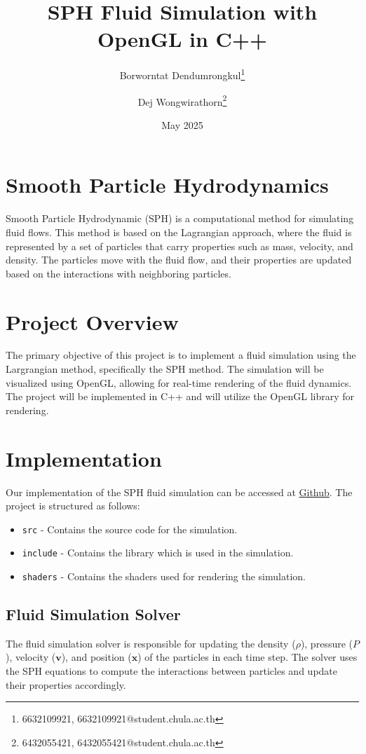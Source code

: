 \documentclass[a4paper]{article}
\title{SPH Fluid Simulation with OpenGL in C++}
\author{
  Borworntat Dendumrongkul\thanks{6632109921, 6632109921@student.chula.ac.th} \and 
  Dej Wongwirathorn\thanks{6432055421, 6432055421@student.chula.ac.th}
}
\date{May 2025}
\begin{document}
\maketitle

\section{Smooth Particle Hydrodynamics}

Smooth Particle Hydrodynamic (SPH) is a computational method for simulating fluid flows.
This method is based on the Lagrangian approach, where the fluid is represented by a set of particles that carry properties such as mass, velocity, and density.
The particles move with the fluid flow, and their properties are updated based on the interactions with neighboring particles.

\section{Project Overview}

The primary objective of this project is to implement a fluid simulation using the Largrangian method, specifically the SPH method.
The simulation will be visualized using OpenGL, allowing for real-time rendering of the fluid dynamics.
The project will be implemented in C++ and will utilize the OpenGL library for rendering.

\section{Implementation}

Our implementation of the SPH fluid simulation can be accessed at \href{https://github.com/MasterIceZ/SPH-FluidSimulation}{Github}.
The project is structured as follows:
\begin{itemize}
  \item \verb|src| - Contains the source code for the simulation.
  \item \verb|include| - Contains the library which is used in the simulation.
  \item \verb|shaders| - Contains the shaders used for rendering the simulation.
\end{itemize}

\subsection{Fluid Simulation Solver}

The fluid simulation solver is responsible for updating the density ($\rho$), pressure ($P$), velocity ($\mathbf{v}$), and position ($\mathbf{x}$) of the particles in each time step.
The solver uses the SPH equations to compute the interactions between particles and update their properties accordingly.
\end{document}
